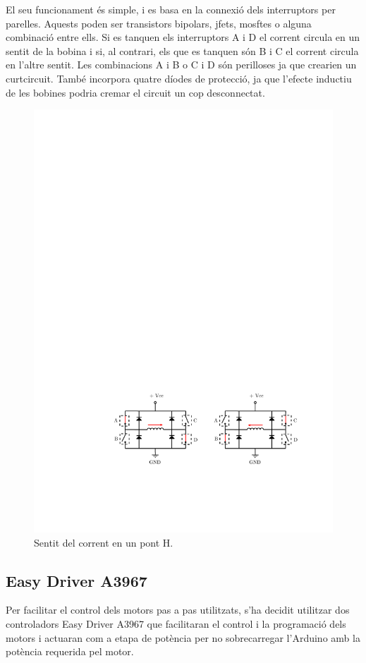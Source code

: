 El seu funcionament és simple, i es basa en la connexió dels interruptors per parelles. Aquests poden ser transistors bipolars, jfets, mosftes o alguna combinació entre ells. Si es tanquen els interruptors A i D el corrent circula en un sentit de la bobina i si, al contrari, els que es tanquen són B i C el corrent circula en l'altre sentit. Les combinacions A i B o C i D són perilloses ja que crearien un curtcircuit. També incorpora quatre díodes de protecció, ja que l'efecte inductiu de les bobines podria cremar el circuit un cop desconnectat.

\begin{figure}[H]
	\centering
	\includegraphics{PontHfuncionament}
	\caption{Sentit del corrent en un pont H.}
	\label{fig:ponthfuncionament}
\end{figure}


\subsection{Easy Driver A3967}
Per facilitar el control dels motors pas a pas utilitzats, s'ha decidit utilitzar dos controladors Easy Driver A3967 que facilitaran el control i la programació dels motors i actuaran com a etapa de potència per no sobrecarregar l'Arduino amb la potència requerida pel motor.


